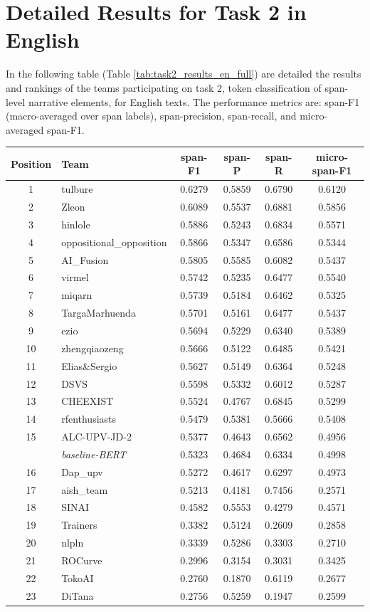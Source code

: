 \documentclass{Configuration_Files/PoliMi3i_thesis}
\begin{document}
\section{Detailed Results for Task 2 in English}
In the following table (Table \ref{tab:task2_results_en_full}) are detailed the results and rankings of the teams participating on task 2, token classification of span-level narrative elements, for English texts. The performance metrics are: span-F1 (macro-averaged over span labels), span-precision, span-recall, and micro-averaged span-F1. 

\begin{table}[H]
\centering
\small
\renewcommand{\arraystretch}{0.8} %
\begin{tabular}{clcccc}
\hline
\textbf{Position} & \textbf{Team} & \textbf{span-F1} & \textbf{span-P} & \textbf{span-R} & \textbf{micro-span-F1} \\ \hline
1 & tulbure & 0.6279 & 0.5859 & 0.6790 & 0.6120 \\
2 & Zleon & 0.6089 & 0.5537 & 0.6881 & 0.5856 \\
3 & hinlole & 0.5886 & 0.5243 & 0.6834 & 0.5571 \\
4 & oppositional\_opposition & 0.5866 & 0.5347 & 0.6586 & 0.5344 \\
5 & AI\_Fusion & 0.5805 & 0.5585 & 0.6082 & 0.5437 \\
6 & virmel & 0.5742 & 0.5235 & 0.6477 & 0.5540 \\
7 & miqarn & 0.5739 & 0.5184 & 0.6462 & 0.5325 \\
8 & TargaMarhuenda & 0.5701 & 0.5161 & 0.6477 & 0.5437 \\
9 & ezio & 0.5694 & 0.5229 & 0.6340 & 0.5389 \\
10 & zhengqiaozeng & 0.5666 & 0.5122 & 0.6485 & 0.5421 \\
11 & Elias\&Sergio & 0.5627 & 0.5149 & 0.6364 & 0.5248 \\
12 & DSVS & 0.5598 & 0.5332 & 0.6012 & 0.5287 \\
13 & CHEEXIST & 0.5524 & 0.4767 & 0.6845 & 0.5299 \\
14 & rfenthusiasts & 0.5479 & 0.5381 & 0.5666 & 0.5408 \\
15 & ALC-UPV-JD-2 & 0.5377 & 0.4643 & 0.6562 & 0.4956 \\
& \textit{baseline-BERT} & 0.5323 & 0.4684 & 0.6334 & 0.4998 \\
16 & Dap\_upv & 0.5272 & 0.4617 & 0.6297 & 0.4973 \\
17 & aish\_team & 0.5213 & 0.4181 & 0.7456 & 0.2571 \\
18 & SINAI & 0.4582 & 0.5553 & 0.4279 & 0.4571 \\
19 & Trainers & 0.3382 & 0.5124 & 0.2609 & 0.2858 \\
20 & nlpln & 0.3339 & 0.5286 & 0.3303 & 0.2710 \\
21 & ROCurve & 0.2996 & 0.3154 & 0.3031 & 0.3425 \\
22 & TokoAI & 0.2760 & 0.1870 & 0.6119 & 0.2677 \\
23 & DiTana & 0.2756 & 0.5259 & 0.1947 & 0.2599 \\


\end{tabular}
\end{table}
\end{document}

